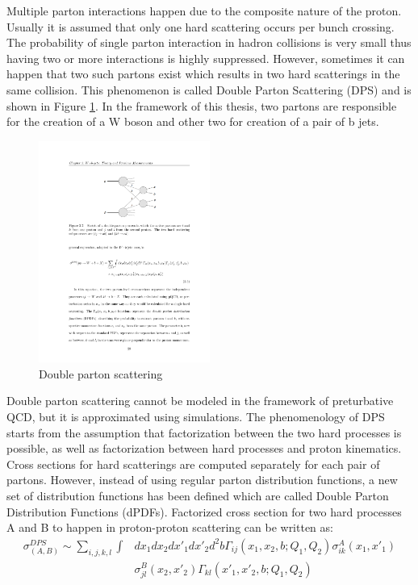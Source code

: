 \par Multiple parton interactions happen due to the composite nature of the proton. Usually it is assumed that only one hard scattering occurs per bunch crossing. The probability of single parton interaction in hadron collisions is very small thus having two or more interactions is highly suppressed. However, sometimes it can happen that two such partons exist which results in two hard scatterings in the same collision. This phenomenon is called Double Parton Scattering (DPS) and is shown in Figure \ref{fig:DPS_diag}. In the framework of this thesis, two partons are responsible for the creation of a W boson and other two for creation of a pair of b jets. 
\begin{figure}[htbp]
	\centering
		\includegraphics[width=0.5\textwidth]{Figures/DPS_diag.pdf}
	\caption[Double parton scattering]{Double parton scattering}
	\label{fig:DPS_diag}
\end{figure}
\par Double parton scattering cannot be modeled in the framework of preturbative QCD, but it is approximated using simulations. The phenomenology of DPS starts from the assumption that factorization between the two hard processes is possible, as well as factorization between hard processes and proton kinematics. Cross sections for hard scatterings are computed separately for each pair of partons. However, instead of using regular parton distribution functions, a new set of distribution functions has been defined which are called Double Parton Distribution Functions (dPDFs). Factorized cross section for two hard processes A and B to happen in proton-proton scattering can be written as:
\begin{equation}
\begin{split}
\sigma_{(A,B)}^{DPS} \sim \sum\limits_{i,j,k,l} \int & dx_1 dx_2  dx'_1 dx'_2 d^2b  \Gamma_{ij}(x_1,x_2,b;Q_1,Q_2)\sigma_{ik}^A(x_1,x'_1) \\
 & \sigma_{jl}^B(x_2,x'_2) \Gamma_{kl}(x'_1,x'_2,b;Q_1,Q_2)
\end{split}
\end{equation}

